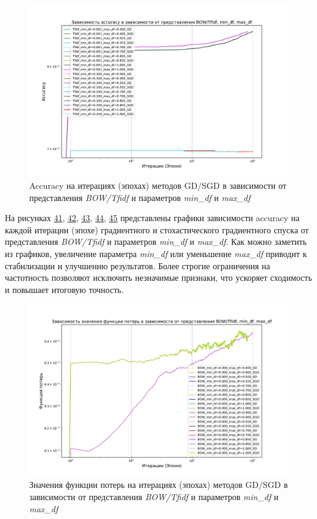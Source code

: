 \documentclass[14pt]{extarticle}
\begin{document}
\begin{figure}[H]
    \centering
    \includegraphics[width=0.85\linewidth]
    {exp_8_min_max_df_acc_5.pdf}
    \caption{Accuracy на итерациях (эпохах) методов GD/SGD в зависимости от представления \textit{BOW/Tfidf} и параметров \textit{min\_df} и \textit{max\_df}}
    \label{fig:exp_8_min_max_df_acc_5}
\end{figure}

На рисунках \hyperref[fig:exp_8_min_max_df_acc_1]{41}, \hyperref[fig:exp_8_min_max_df_acc_2]{42}, \hyperref[fig:exp_8_min_max_df_acc_3]{43}, \hyperref[fig:exp_8_min_max_df_acc_4]{44}, \hyperref[fig:exp_8_min_max_df_acc_5]{45} представлены графики зависимости accuracy на каждой итерации (эпохе) градиентного и стохастического градиентного спуска от представления \textit{BOW/Tfidf} и параметров \textit{min\_df} и \textit{max\_df}. Как можно заметить из графиков, увеличение параметра \textit{min\_df} или уменьшение \textit{max\_df} приводит к стабилизации и улучшению результатов. Более строгие ограничения на частотность позволяют исключить незначимые признаки, что ускоряет сходимость и повышает итоговую точность.

\begin{figure}[H]
    \centering
    \includegraphics[width=0.85\linewidth]
    {exp_8_min_max_df_loss_1.pdf}
    \caption{Значения функции потерь на итерациях (эпохах) методов GD/SGD в зависимости от представления \textit{BOW/Tfidf} и параметров \textit{min\_df} и \textit{max\_df}}
    \label{fig:exp_8_min_max_df_loss_1}
\end{figure}
\end{document}
